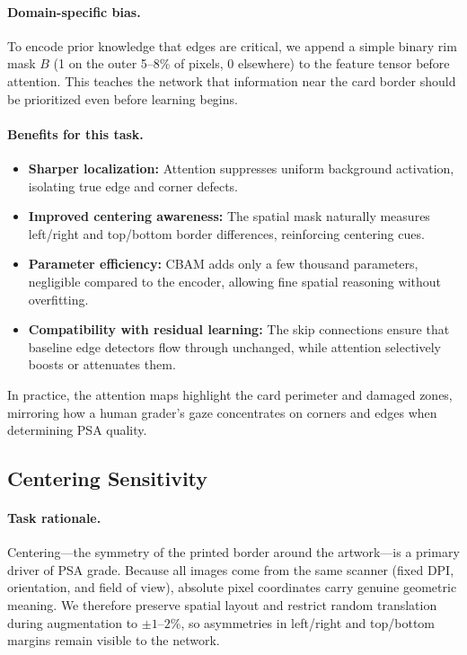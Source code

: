 \documentclass[12pt]{article}
\begin{document}
\paragraph{Domain-specific bias.}
To encode prior knowledge that edges are critical, we append a simple binary rim mask $B$ (1 on the outer 5--8\% of pixels, 0 elsewhere) to the feature tensor before attention. 
This teaches the network that information near the card border should be prioritized even before learning begins.

\paragraph{Benefits for this task.}
\begin{itemize}
    \item \textbf{Sharper localization:} Attention suppresses uniform background activation, isolating true edge and corner defects.
    \item \textbf{Improved centering awareness:} The spatial mask naturally measures left/right and top/bottom border differences, reinforcing centering cues.
    \item \textbf{Parameter efficiency:} CBAM adds only a few thousand parameters, negligible compared to the encoder, allowing fine spatial reasoning without overfitting.
    \item \textbf{Compatibility with residual learning:} The skip connections ensure that baseline edge detectors flow through unchanged, while attention selectively boosts or attenuates them.
\end{itemize}

In practice, the attention maps highlight the card perimeter and damaged zones, 
mirroring how a human grader’s gaze concentrates on corners and edges when determining PSA quality.


\subsection{Centering Sensitivity}
\label{subsec:center}

\paragraph{Task rationale.}
Centering---the symmetry of the printed border around the artwork---is a primary driver of PSA grade. 
Because all images come from the same scanner (fixed DPI, orientation, and field of view), absolute pixel coordinates carry genuine geometric meaning. 
We therefore preserve spatial layout and restrict random translation during augmentation to $\pm 1$--$2\%$, so asymmetries in left/right and top/bottom margins remain visible to the network.
\end{document}
